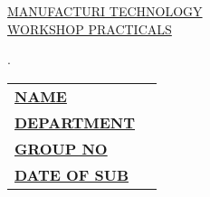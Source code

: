 \documentclass[12pt,a4paper]{article}
\begin{document}
\begin{titlepage}
	
	\begin{flushright}
        \textbf{\uppercase{\fontsize{12}{18} \selectfont {Assignment No: 01}}}
    \end{flushright}

    \vspace*{\fill}
    \begin{center}
        \uppercase{\fontsize{30}{45}\selectfont \ul{MANUFACTURI TECHNOLOGY}}\\
        \uppercase{\fontsize{20}{30}\selectfont \ul{Workshop Practicals}}
    \end{center}
    \vfill %
    \begin{multicols}{2}
        .
        \\

        \columnbreak	
        \begin{tabular}{ll}
            \vspace{6pt}

            \textbf{\uppercase{\underline{Name}}}       &
            \textbf{\uppercase{\fontsize{12}{18} \selectfont {:}}} 
            {\fontsize{12}{18} \selectfont {B Gnanakeethan}}      \\

            \vspace{6pt}
            \textbf{\uppercase{\underline{Department}}} &
            \textbf{\uppercase{\fontsize{12}{18} \selectfont {:}}} 
            {\fontsize{12}{18} \selectfont {Eng. Tech}}\\

            \vspace{6pt}
            \textbf{\uppercase{\underline{Group No}}}   &
            \textbf{\uppercase{\fontsize{12}{18} \selectfont {:}}} 
            {\fontsize{12}{18} \selectfont {MT7}}  \\

            \vspace{6pt}
            \textbf{\uppercase{\underline{Date of Sub}}}   &
            \textbf{\uppercase{\fontsize{12}{18} \selectfont {:}}} 
            {\fontsize{12}{18} \selectfont {11/01/2019}}  \\


        \end{tabular}
    \end{multicols}

\end{titlepage}
\end{document}
